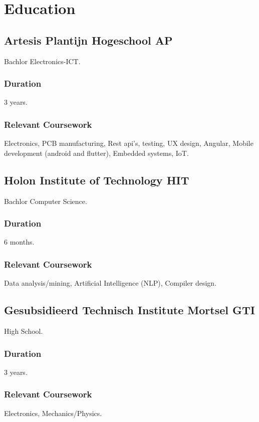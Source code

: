 \section{Educat\textcolor{mycolor}{ion}}
  \subsection{Artesis Plantijn Hogeschool \textcolor{mycolor}{AP}}
    \hspace*{\fill}{\textcolor{mygrey}{In progress}}

    Bachlor Electronics-ICT.
    \subsubsection{Duration}
      3 years.
    \subsubsection{Relevant Coursework}
      Electronics, PCB manufacturing, Rest api's, testing, UX design, Angular, Mobile development (android and flutter), Embedded systems, IoT.
  \subsection{Holon Institute of Technology \textcolor{mycolor}{HIT}}
    \hspace*{\fill}{\textcolor{mygrey}{In progress}}

    Bachlor Computer Science.
    \subsubsection{Duration}
      6 months.
    \subsubsection{Relevant Coursework}
      Data analysis/mining, Artificial Intelligence (NLP), Compiler design.

      
    \subsection{Gesubsidieerd Technisch Institute Mortsel \textcolor{mycolor}{GTI}}
    \hspace*{\fill}{\textcolor{mygrey}{2016}}
    
    High School.
    \subsubsection{Duration}
      3 years.
    \subsubsection{Relevant Coursework}
      Electronics, Mechanics/Physics.
